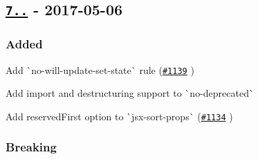 \subsection*{\href{https://github.com/yannickcr/eslint-plugin-react/compare/v6.10.3...v7.0.0}{\tt 7..} -\/ 2017-\/05-\/06}

\subsubsection*{Added}


\begin{DoxyItemize}
\item Add \`{}no-\/will-\/update-\/set-\/state\`{} rule (\href{https://github.com/yannickcr/eslint-plugin-react/pull/1139}{\tt \#1139} )
\item Add import and destructuring support to \`{}no-\/deprecated\`{}
\item Add {\ttfamily reserved\+First} option to \`{}jsx-\/sort-\/props\`{} (\href{https://github.com/yannickcr/eslint-plugin-react/pull/1134}{\tt \#1134} )
\end{DoxyItemize}

\subsubsection*{Breaking}



